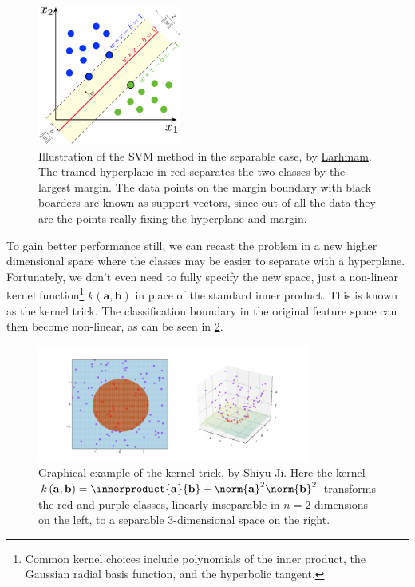 \begin{figure}[H]
\centering
\includegraphics[width=0.42\textwidth]{figures/ml/svm_margin.png}
\vspace{0.2cm}
\caption{
Illustration of the SVM method in the separable case,
by \href{https://en.wikipedia.org/wiki/File:SVM_margin.png}{Larhmam}.
The trained hyperplane in red separates the two classes by the largest margin.
The data points on the margin boundary with black boarders
are known as support vectors, since out of all the data
they are the points really fixing the hyperplane and margin.
}
\label{fig:svm_sep}
\end{figure}

To gain better performance still, we can recast the problem in
a new higher dimensional space where the classes may be easier to separate with a hyperplane.
Fortunately, we don't even need to fully specify the new space,
just a non-linear kernel function\footnote{Common kernel choices include
polynomials of the inner product,
the Gaussian radial basis function,
and the hyperbolic tangent.} $k\left(\mathbf{a},\mathbf{b}\right)$
in place of the standard inner product. This is known as the kernel trick.
The classification boundary in the original feature space can then become non-linear,
as can be seen in \cref{fig:svm_kernel_trick}.

\vspace{-0.3cm}%

\begin{figure}[H]
\centering
\includegraphics[width=0.8\textwidth,trim={4.0cm 0.8cm 4.0cm 1.4cm},clip]{figures/ml/kernel_trick_example.png}%
\caption{
Graphical example of the kernel trick, by \href{https://en.wikipedia.org/wiki/File:Kernel_trick_idea.svg}{Shiyu Ji}.
Here the kernel $k\left(\mathbf{a},\mathbf{b}\right) = \innerproduct{\mathbf{a}}{\mathbf{b}} + \norm{\mathbf{a}}^{2} \norm{\mathbf{b}}^{2}$
transforms the red and purple classes, linearly inseparable in $n=2$ dimensions on the left,
to a separable $3$-dimensional space on the right.
}
\label{fig:svm_kernel_trick}
\end{figure}

